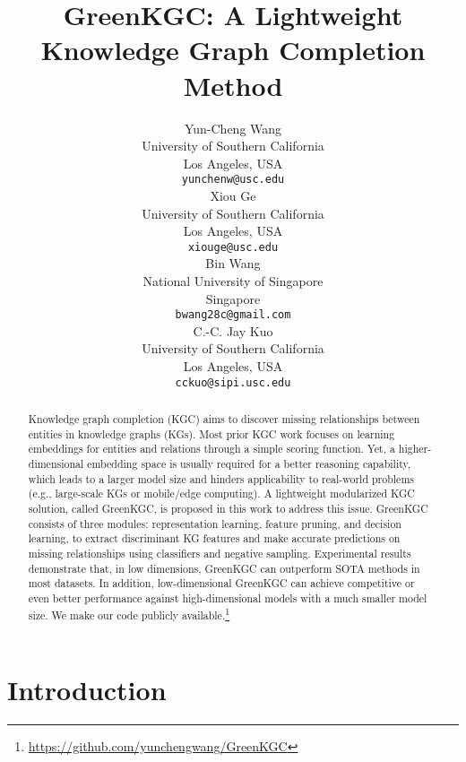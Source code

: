 \documentclass{article}
\title{GreenKGC: A Lightweight Knowledge Graph Completion Method}
\author{
  Yun-Cheng Wang \\
  University of Southern California \\
  Los Angeles, USA\\
  \texttt{yunchenw@usc.edu} \\
\And
  Xiou Ge \\
  University of Southern California \\
  Los Angeles, USA\\
  \texttt{xiouge@usc.edu} \\
   \And
  Bin Wang \\
  National University of Singapore \\
  Singapore\\
  \texttt{bwang28c@gmail.com} \\
   \And
  C.-C. Jay Kuo \\
  University of Southern California \\
  Los Angeles, USA\\
  \texttt{cckuo@sipi.usc.edu} \\
}
\begin{document}
\maketitle


\begin{abstract}
Knowledge graph completion (KGC) aims to discover missing relationships
between entities in knowledge graphs (KGs).  Most prior KGC work focuses
on learning embeddings for entities and relations through a simple 
scoring function. Yet, a higher-dimensional embedding space 
is usually required for a better reasoning capability, which 
leads to a larger model size and hinders applicability to 
real-world problems (e.g., large-scale KGs or mobile/edge computing). 
A lightweight modularized KGC solution, called GreenKGC, is 
proposed in this work to address this issue.  GreenKGC
consists of three modules: representation learning, feature
pruning, and decision learning, to extract discriminant KG features
and make accurate predictions on missing relationships using classifiers
and negative sampling.
Experimental results demonstrate that, in low dimensions, GreenKGC can
outperform SOTA methods in most datasets. In addition, low-dimensional 
GreenKGC can achieve competitive or even better performance against
high-dimensional models with a much smaller model size. We make our
code publicly available.\footnote{\url{https://github.com/yunchengwang/GreenKGC}}
\end{abstract}





\section{Introduction}\label{sec:introduction}
\end{document}
